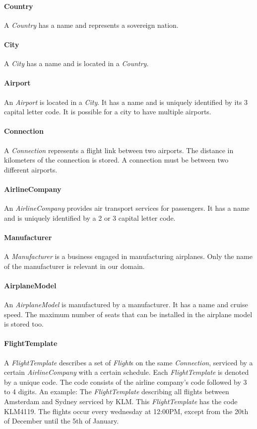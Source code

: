 \documentclass[a4paper]{article}
\newcommand{\field}[1]{\emph{#1}}
\begin{document}
\paragraph{Country}
A \field{Country} has a name and represents a sovereign nation.
\paragraph{City}
A \field{City} has a name and is located in a \field{Country}.
\paragraph{Airport}
An \field{Airport} is located in a \field{City}.
It has a name and is uniquely identified by its 3 capital letter code.
It is possible for a city to have multiple airports.
\paragraph{Connection}
A \field{Connection} represents a flight link between two airports.
The distance in kilometers of the connection is stored.
A connection must be between two different airports.
\paragraph{AirlineCompany}
An \field{AirlineCompany} provides air transport services for passengers.
It has a name and is uniquely identified by a 2 or 3 capital letter code.
\paragraph{Manufacturer}
A \field{Manufacturer} is a business engaged in manufacturing airplanes.
Only the name of the manufacturer is relevant in our domain.
\paragraph{AirplaneModel}
An \field{AirplaneModel} is manufactured by a manufacturer.
It has a name and cruise speed.
The maximum number of seats that can be installed in the airplane model is stored too.
\paragraph{FlightTemplate}\label{par: flighttemplate}
A \field{FlightTemplate} describes a set of \field{Flight}s on the same \field{Connection}, serviced by a certain \field{AirlineCompany} with a certain schedule.
Each \field{FlightTemplate} is denoted by a unique code.
The code consists of the airline company's code followed by 3 to 4 digits.
An example: The \field{FlightTemplate} describing all flights between Amsterdam and Sydney serviced by KLM. This \field{FlightTemplate} has the code KLM4119.
The flights occur every wednesday at 12:00PM, except from the 20th of December until the 5th of January.
\end{document}
